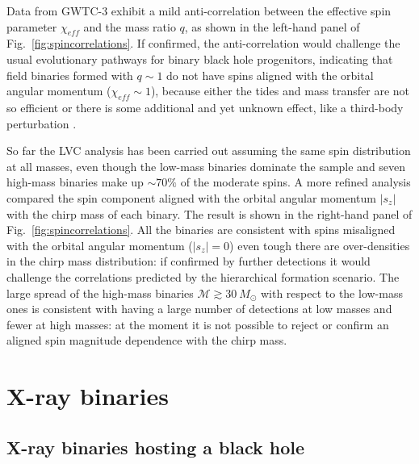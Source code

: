 \documentclass[a4paper,titlepage]{book}     	%
\newcommand{\sun}{\ensuremath{_\odot}}
\newcommand{\msun}{\ensuremath{M\sun}}
\begin{document}
Data from GWTC-3 exhibit a mild anti-correlation between the effective spin parameter $\chi_{eff}$ and the mass ratio $q$, as shown in the left-hand panel of Fig.\ \ref{fig:spincorrelations}. If confirmed, the anti-correlation would challenge the usual evolutionary pathways for binary black hole progenitors, indicating that field binaries formed with $q \sim 1$ do not have spins aligned with the orbital angular momentum ($\chi_{eff} \sim 1$),  because either the tides and mass transfer are not so efficient or there is some additional and yet unknown effect, like a third-body perturbation \cite{misalignedbinary}.


So far the LVC analysis has been carried out assuming the same spin distribution at all masses, even though the low-mass binaries dominate the sample and seven high-mass binaries make up $\sim 70 \%$ of the moderate spins. A more refined analysis compared the spin component aligned with the orbital angular momentum $|s_z|$ with the chirp mass of each binary. The result is shown in the right-hand panel of Fig.\ \ref{fig:spincorrelations}. All the binaries are consistent with spins misaligned with the orbital angular momentum ($|s_z| = 0$) even tough there are over-densities in the chirp mass distribution: if confirmed by further detections it would challenge the correlations predicted by the hierarchical formation scenario. The large spread of the high-mass binaries $\mathcal{M} \gtrsim 30~\msun$ with respect to the low-mass ones is consistent with having a large number of detections at low masses and fewer at high masses: at the moment it is not possible to reject or confirm an aligned spin magnitude dependence with the chirp mass.











\section{X-ray binaries}\label{sec:Xraybinaries}

\subsection{X-ray binaries hosting a black hole}\label{subsec:XraybinariesSED}
\end{document}
